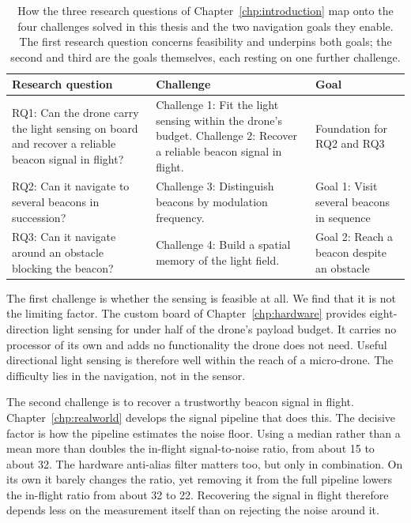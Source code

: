 \begin{table}[htbp]
    \centering
    \caption{How the three research questions of Chapter~\ref{chp:introduction} map onto the four challenges solved in this thesis and the two navigation goals they enable. The first research question concerns feasibility and underpins both goals; the second and third are the goals themselves, each resting on one further challenge.}
    \label{tab:rq-mapping}
    \begin{tabular}{p{} p{} p{}}
        \hline
        Research question & Challenge & Goal \\
        \hline
        RQ1: Can the drone carry the light sensing on board and recover a reliable beacon signal in flight?
            & Challenge 1: Fit the light sensing within the drone's budget. \newline
              Challenge 2: Recover a reliable beacon signal in flight.
            & Foundation for RQ2 and RQ3 \\
        \hline
        RQ2: Can it navigate to several beacons in succession?
            & Challenge 3: Distinguish beacons by modulation frequency.
            & Goal 1: Visit several beacons in sequence \\
        \hline
        RQ3: Can it navigate around an obstacle blocking the beacon?
            & Challenge 4: Build a spatial memory of the light field.
            & Goal 2: Reach a beacon despite an obstacle \\
        \hline
    \end{tabular}
\end{table}

The first challenge is whether the sensing is feasible at all. We find that it is not the limiting factor. The custom board of Chapter~\ref{chp:hardware} provides eight-direction light sensing for under half of the drone's payload budget. It carries no processor of its own and adds no functionality the drone does not need. Useful directional light sensing is therefore well within the reach of a micro-drone. The difficulty lies in the navigation, not in the sensor.

The second challenge is to recover a trustworthy beacon signal in flight. Chapter~\ref{chp:realworld} develops the signal pipeline that does this. The decisive factor is how the pipeline estimates the noise floor. Using a median rather than a mean more than doubles the in-flight signal-to-noise ratio, from about 15 to about 32. The hardware anti-alias filter matters too, but only in combination. On its own it barely changes the ratio, yet removing it from the full pipeline lowers the in-flight ratio from about 32 to 22. Recovering the signal in flight therefore depends less on the measurement itself than on rejecting the noise around it.


